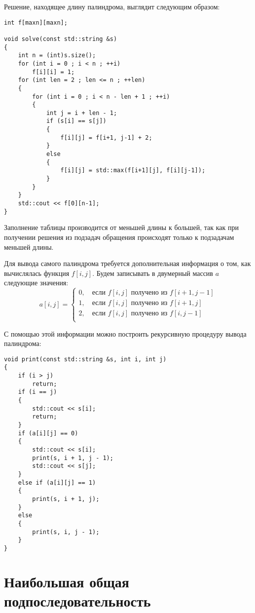 \documentclass[14pt,openany]{book}
\begin{document}
Решение, находящее длину палиндрома, выглядит следующим образом:

\begin{lstlisting}
int f[maxn][maxn];

void solve(const std::string &s)
{
    int n = (int)s.size();
    for (int i = 0 ; i < n ; ++i)
        f[i][i] = 1;
    for (int len = 2 ; len <= n ; ++len)
    {
        for (int i = 0 ; i < n - len + 1 ; ++i)
        {
            int j = i + len - 1;
            if (s[i] == s[j])
            {
                f[i][j] = f[i+1, j-1] + 2;
            }
            else
            {
                f[i][j] = std::max(f[i+1][j], f[i][j-1]);
            }
        }
    }
    std::cout << f[0][n-1];
}
\end{lstlisting}

Заполнение таблицы производится от меньшей длины к большей, так как
при получении решения из подзадач обращения происходят только к подзадачам
меньшей длины.

Для вывода самого палиндрома требуется дополнительная информация о том, как
вычислялась функция $f[i,j]$. Будем записывать в двумерный массив $a$ следующие
значения:
$$
  a[i,j] = \left\{\begin{array}{l}
      0, \quad \text{если $f[i,j]$ получено из $f[i+1,j-1]$} \\
      1, \quad \text{если $f[i,j]$ получено из $f[i+1,j]$} \\
      2, \quad \text{если $f[i,j]$ получено из $f[i,j-1]$} \\
  \end{array}\right.
$$

С помощью этой информации можно построить рекурсивную процедуру вывода
палиндрома:

\begin{lstlisting}
void print(const std::string &s, int i, int j)
{
    if (i > j)
        return;
    if (i == j)
    {
        std::cout << s[i];
        return;
    }
    if (a[i][j] == 0)
    {
        std::cout << s[i];
        print(s, i + 1, j - 1);
        std::cout << s[j];
    }
    else if (a[i][j] == 1)
    {
        print(s, i + 1, j);
    }
    else
    {
        print(s, i, j - 1);
    }
}
\end{lstlisting}

\section{Наибольшая общая подпоследовательность}
\end{document}
